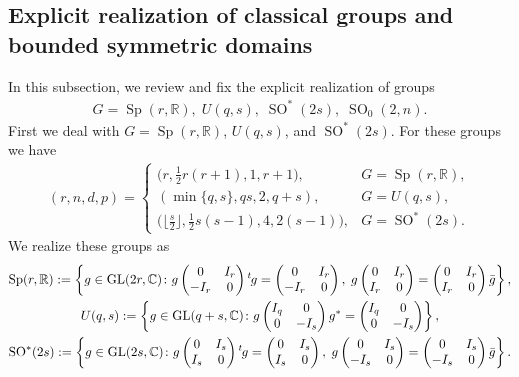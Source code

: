 \documentclass[pdftex]{sigma}
\numberwithin{equation}{section}
\newcommand{\BR}{\mathbb{R}}
\newcommand{\BC}{\mathbb{C}}
\begin{document}
\subsection{Explicit realization of classical groups and bounded symmetric domains}\label{realize}
In this subsection, we review and fix the explicit realization of groups
\begin{gather*} G=\operatorname{Sp}(r,\BR),\; U(q,s),\; \operatorname{SO}^*(2s),\; \operatorname{SO}_0(2,n). \end{gather*}
First we deal with $G=\operatorname{Sp}(r,\BR)$, $U(q,s)$, and $\operatorname{SO}^*(2s)$. For these groups we have
\begin{gather*} (r,n,d,p)=\begin{cases}
\big(r,\frac{1}{2}r(r+1),1,r+1\big),& G=\operatorname{Sp}(r,\BR) ,\\
(\min\{q,s\},qs,2,q+s),& G=U(q,s) ,\\
\big(\big\lfloor\frac{s}{2}\big\rfloor,\frac{1}{2}s(s-1),4,2(s-1)\big), & G=\operatorname{SO}^*(2s). \end{cases} \end{gather*}
We realize these groups as
\begin{gather*}
\operatorname{Sp}(r,\BR) :=\left\{ g\in {\rm GL}(2r,\BC)\colon g\begin{pmatrix}0&I_r\\-I_r&0\end{pmatrix}{}^t\hspace{-1pt}g=\begin{pmatrix}0&I_r\\-I_r&0\end{pmatrix},\;
g\begin{pmatrix}0&I_r\\I_r&0\end{pmatrix}=\begin{pmatrix}0&I_r\\I_r&0\end{pmatrix}\bar{g}\right\},\\
U(q,s) :=\left\{ g\in {\rm GL}(q+s,\BC)\colon g\begin{pmatrix}I_q&0\\0&-I_s\end{pmatrix}g^*=\begin{pmatrix}I_q&0\\0&-I_s\end{pmatrix}\right\},\\
\operatorname{SO}^*(2s) :=\left\{ g\in {\rm GL}(2s,\BC)\colon g\begin{pmatrix}0&I_s\\I_s&0\end{pmatrix}{}^t\hspace{-1pt}g=\begin{pmatrix}0&I_s\\I_s&0\end{pmatrix},\;
g\begin{pmatrix}0&I_s\\-I_s&0\end{pmatrix}=\begin{pmatrix}0&I_s\\-I_s&0\end{pmatrix}\bar{g}\right\}.
\end{gather*}
\end{document}
